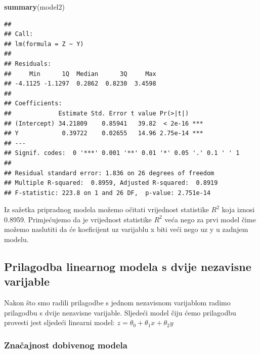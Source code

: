 \documentclass[]{article}
\newenvironment{Shaded}{\begin{snugshade}}{\end{snugshade}}
\newcommand{\KeywordTok}[1]{\textcolor[rgb]{0.13,0.29,0.53}{\textbf{{#1}}}}
\newcommand{\StringTok}[1]{\textcolor[rgb]{0.31,0.60,0.02}{{#1}}}
\newcommand{\NormalTok}[1]{{#1}}
\begin{document}
\begin{Shaded}
\begin{Highlighting}[]
\KeywordTok{summary}\NormalTok{(model2)}
\end{Highlighting}
\end{Shaded}

\begin{verbatim}
## 
## Call:
## lm(formula = Z ~ Y)
## 
## Residuals:
##     Min      1Q  Median      3Q     Max 
## -4.1125 -1.1297  0.2862  0.8230  3.4598 
## 
## Coefficients:
##             Estimate Std. Error t value Pr(>|t|)    
## (Intercept) 34.21809    0.85941   39.82  < 2e-16 ***
## Y            0.39722    0.02655   14.96 2.75e-14 ***
## ---
## Signif. codes:  0 '***' 0.001 '**' 0.01 '*' 0.05 '.' 0.1 ' ' 1
## 
## Residual standard error: 1.836 on 26 degrees of freedom
## Multiple R-squared:  0.8959, Adjusted R-squared:  0.8919 
## F-statistic: 223.8 on 1 and 26 DF,  p-value: 2.751e-14
\end{verbatim}

Iz sažetka pripradnog modela možemo očitati vrijednost statistike
\(R^2\) koja iznosi 0.8959. Primjećujemo da je vrijednost statistike
\(R^2\) veća nego za prvi model čime možemo naslutiti da će koeficijent
uz varijablu x biti veći nego uz y u zadnjem modelu.

\subsection{Prilagodba linearnog modela s dvije nezavisne
varijable}\label{prilagodba-linearnog-modela-s-dvije-nezavisne-varijable}

Nakon što smo radili prilagodbe s jednom nezavisnom varijablom radimo
prilagodbu s dvije nezavisne varijable. Sljedeći model čiju ćemo
prilagodbu provesti jest sljedeći linearni model: \(z = \theta_0 +
\theta_1 x + \theta_2 y \)

\begin{Shaded}
\end{Shaded}

\subsubsection{Značajnost dobivenog
modela}\label{znacajnost-dobivenog-modela}
\end{document}
